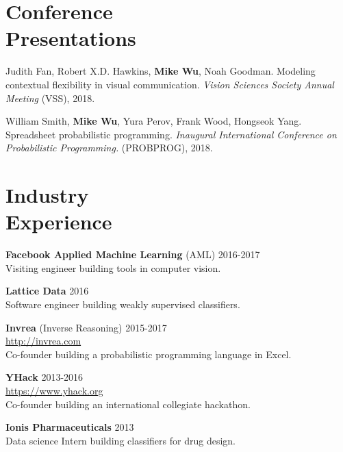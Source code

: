 \documentclass[margin, 10pt]{res} %
\begin{document}
\begin{resume}
\section{Conference \\ Presentations}

Judith Fan, Robert X.D. Hawkins, \textbf{Mike Wu}, Noah Goodman. Modeling contextual flexibility in visual communication. \textit{Vision Sciences Society Annual Meeting} (VSS), 2018.

William Smith, \textbf{Mike Wu}, Yura Perov, Frank Wood, Hongseok Yang. Spreadsheet probabilistic programming. \textit{Inaugural International Conference on Probabilistic Programming.} (PROBPROG), 2018.


\section{Industry \\ Experience}

\textbf{Facebook Applied Machine Learning} (AML) \hfill 2016-2017 \\
Visiting engineer building tools in computer vision.

\textbf{Lattice Data} \hfill 2016 \\
Software engineer building weakly supervised classifiers.

\textbf{Invrea} (Inverse Reasoning) \hfill 2015-2017 \\
\url{http://invrea.com} \\
Co-founder building a probabilistic programming language in Excel.

\textbf{YHack} \hfill 2013-2016 \\
\url{https://www.yhack.org} \\
Co-founder building an international collegiate hackathon.

\textbf{Ionis Pharmaceuticals} \hfill 2013 \\
Data science Intern building classifiers for drug design.


\end{resume}
\end{document}
